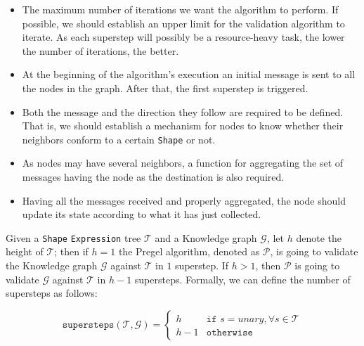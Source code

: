 \begin{itemize}
    \itemsep0.5em
    \item The maximum number of iterations we want the algorithm to perform. If possible, we should establish an upper limit for the validation algorithm to iterate. As each superstep will possibly be a resource-heavy task, the lower the number of iterations, the better.
    \item At the beginning of the algorithm's execution an initial message is sent to all the nodes in the graph. After that, the first superstep is triggered.
    \item Both the message and the direction they follow are required to be defined. That is, we should establish a mechanism for nodes to know whether their neighbors conform to a certain \texttt{Shape} or not.
    \item As nodes may have several neighbors, a function for aggregating the set of messages having the node as the destination is also required.
    \item Having all the messages received and properly aggregated, the node should update its state according to what it has just collected.
\end{itemize}

\begin{pseudocode}
    
\end{pseudocode}

\begin{theorem}
    Given a \texttt{Shape} \texttt{Expression} tree $\mathcal{T}$ and a Knowledge graph $\mathcal{G}$, let $h$ denote the height of $\mathcal{T}$; then if $h = 1$ the Pregel algorithm, denoted as $\mathcal{P}$, is going to validate the Knowledge graph $\mathcal{G}$ against $\mathcal{T}$ in $1$ superstep. If $h > 1$, then $\mathcal{P}$ is going to validate $\mathcal{G}$ against $\mathcal{T}$ in $h - 1$ supersteps. Formally, we can define the number of supersteps as follows:

    \begin{equation}
        \texttt{supersteps}(\mathcal{T}, \mathcal{G}) =
        \begin{cases}
            h     & \texttt{if } s = unary, \forall s \in \mathcal{T} \\
            h - 1 & \texttt{otherwise}
        \end{cases}
    \end{equation}
\end{theorem}

